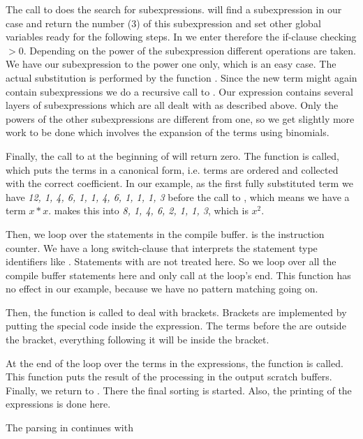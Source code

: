 The call to  does the search for subexpressions.  will
find a subexpression in our case and return the number (3) of this subexpression
and set other global variables ready for the following steps. In 
we enter therefore the if-clause checking $> 0$.  Depending on the
power of the subexpression different operations are taken. We have our
subexpression to the power one only, which is an easy case. The actual
substitution is performed by the function . Since the new term
might again contain subexpressions we do a recursive call to .
Our expression contains several layers of subexpressions which are all dealt
with as described above. Only the powers of the other subexpressions are
different from one, so we get slightly more work to be done which involves the
expansion of the terms using binomials. 

Finally, the call to  at the beginning of  will
return zero. The function  is called, which puts the terms in a
canonical form, i.e. terms are ordered and collected with the correct
coefficient. In our example, as the first fully substituted term we have
{\it 12, 1, 4, 6, 1, 1, 4, 6, 1, 1, 1, 3} before the call to
, which means we have a term $x*x$. 
makes this into {\it 8, 1, 4, 6, 2, 1, 1, 3}, which is $x^2$.

Then, we loop over the statements in the compile buffer.  is the
instruction counter. We have a long switch-clause that interprets the statement
type identifiers like . Statements with  are not
treated here. So we loop over all the compile buffer statements here and only
call  at the loop's end. This function has no effect in our
example, because we have no pattern matching going on.

Then, the function  is called to deal with brackets. Brackets
are implemented by putting the special code  inside the expression.
The terms before the  are outside the bracket, everything following it
will be inside the bracket. 

At the end of the loop over the terms in the expressions, the function
 is called. This function puts the result of the processing in
the output scratch buffers. Finally, we return to . There the
final sorting is started. Also, the printing of the expressions is done here.

The parsing in  continues with

